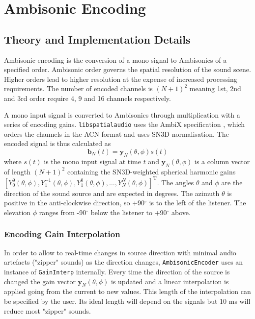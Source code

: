 \documentclass[12pt]{report}
\def\libspataud{\texttt{libspatialaudio}\xspace}
\def\deg{$^{\circ}$ }
\newcommand{\code}[1]{\texttt{#1}}
\begin{document}
\section{Ambisonic Encoding}\label{AmbiEncoding}

\subsection{Theory and Implementation Details}
Ambisonic encoding is the conversion of a mono signal to Ambisonics of a specified order.
Ambisonic order governs the spatial resolution of the sound scene.
Higher orders lead to higher resolution at the expense of increased processing requirements.
The number of encoded channels is $(N + 1)^{2}$ meaning 1st, 2nd and 3rd order require 4, 9 and 16 channels respectively.

A mono input signal is converted to Ambisonics through multiplication with a series of encoding gains.
\libspataud uses the AmbiX specification \cite{nachbar_ambix_2011}, which orders the channels in the ACN format and uses SN3D normalisation.
The encoded signal is thus calculated as
\begin{equation}
    \textbf{b}_{N}(t) = \textbf{y}_{N}(\theta,\phi)s(t)
\end{equation}
\sloppy where $s(t)$ is the mono input signal at time $t$ and $\textbf{y}_{N}(\theta,\phi)$ is a column vector of length $(N + 1)^{2}$ containing the SN3D-weighted spherical harmonic gains $[Y_{0}^{0}(\theta, \phi), Y_{1}^{-1}(\theta, \phi), Y_{1}^{0}(\theta, \phi),\ldots,Y_{N}^{N}(\theta, \phi)]^{\mathrm{T}}$. The angles $\theta$ and $\phi$ are the direction of the sound source and are expected in degrees. The azimuth $\theta$ is positive in the anti-clockwise direction, so +90\deg is to the left of the listener. The elevation $\phi$ ranges from -90\deg below the listener to +90\deg above.

\subsubsection{Encoding Gain Interpolation}

In order to allow to real-time changes in source direction with minimal audio artefacts ("zipper" sounds) as the direction changes, \code{AmbisonicEncoder} uses an instance of \code{GainInterp} internally.
Every time the direction of the source is changed the gain vector $\textbf{y}_{N}(\theta,\phi)$ is updated and a linear interpolation is applied going from the current to new values.
This length of the interpolation can be specified by the user.
Its ideal length will depend on the signals but 10 ms will reduce most "zipper" sounds.
\end{document}
